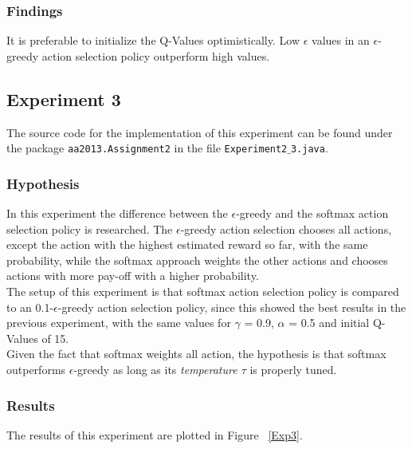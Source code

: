 \documentclass[11pt]{article}
\begin{document}
\subsubsection{Findings}
It is preferable to initialize the Q-Values optimistically. Low $\epsilon$ values in an $\epsilon$-greedy action selection policy outperform high values.

\subsection{Experiment 3}
The source code for the implementation of this experiment can be found under the package \texttt{aa2013.Assignment2} in the file \texttt{Experiment2$\_$3.java}.
\subsubsection{Hypothesis}
In this experiment the difference between the $\epsilon$-greedy and the softmax action selection policy is researched. The $\epsilon$-greedy action selection chooses all actions, except the action with the highest estimated reward so far, with the same probability, while the softmax approach weights the other actions and chooses actions with more pay-off with a higher probability.\\
The setup of this experiment is that softmax action selection policy is compared to an 0.1-$\epsilon$-greedy action selection policy, since this showed the best results in the previous experiment, with the same values for $\gamma$ = 0.9, $\alpha$ = 0.5 and initial Q-Values of 15. \\
Given the fact that softmax weights all action, the hypothesis is that softmax outperforms $\epsilon$-greedy as long as its \emph{temperature $\tau$} is properly tuned.





\subsubsection{Results}
The results of this experiment are plotted in Figure ~\ref{Exp3}.
\end{document}
